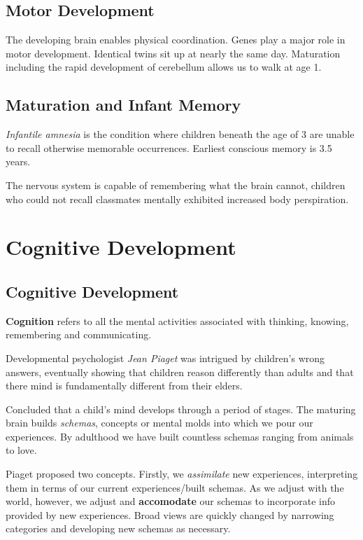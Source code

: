\documentclass[12pt]{article}
\begin{document}
\subsection*{Motor Development}

The developing brain enables physical coordination. Genes play a major role in motor development. Identical twins sit up at nearly the same day. Maturation including the rapid development of cerebellum allows us to walk at age 1. 

\subsection*{Maturation and Infant Memory}
\textit{Infantile amnesia} is the condition where children beneath the age of 3 are unable to recall otherwise memorable occurrences. Earliest conscious memory is 3.5 years. 

The nervous system is capable of remembering what the brain cannot, children who could not recall classmates mentally exhibited increased body perspiration. 

\section*{Cognitive Development}
\subsection*{Cognitive Development}
\textbf{Cognition} refers to all the mental activities associated with thinking, knowing, remembering and communicating.

Developmental psychologist \textit{Jean Piaget} was intrigued by children's wrong answers, eventually showing that children reason differently than adults and that there mind is fundamentally different from their elders. 

Concluded that a child's mind develops through a period of stages. The maturing brain builds \textit{schemas}, concepts or mental molds into which we pour our experiences. By adulthood we have built countless schemas ranging from animals to love.

Piaget proposed two concepts. Firstly, we \textit{assimilate} new experiences, interpreting them in terms of our current experiences/built schemas. As we adjust with the world, however, we adjust and \textbf{accomodate} our schemas to incorporate info provided by new experiences. Broad views are quickly changed by narrowing categories and developing new schemas as necessary.
\end{document}
